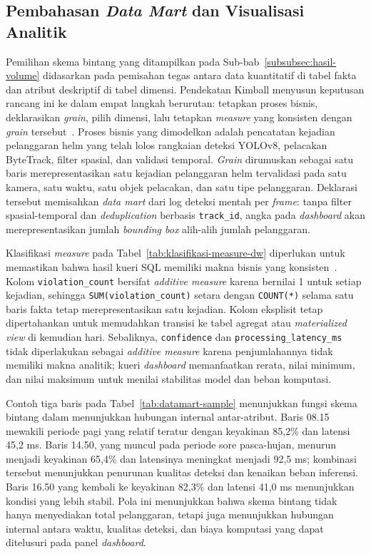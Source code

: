 \subsection{Pembahasan \textit{Data Mart} dan Visualisasi Analitik}
\label{subsec:pembahasan-datamart}

Pemilihan skema bintang yang ditampilkan pada Sub-bab~\ref{subsubsec:hasil-volume} didasarkan pada pemisahan tegas antara data kuantitatif di tabel fakta dan atribut deskriptif di tabel dimensi. Pendekatan Kimball menyusun keputusan rancang ini ke dalam empat langkah berurutan: tetapkan proses bisnis, deklarasikan \textit{grain}, pilih dimensi, lalu tetapkan \textit{measure} yang konsisten dengan \textit{grain} tersebut~\cite{kimball2013dwtoolkit}. Proses bisnis yang dimodelkan adalah pencatatan kejadian pelanggaran helm yang telah lolos rangkaian deteksi YOLOv8, pelacakan ByteTrack, filter spasial, dan validasi temporal. \textit{Grain} dirumuskan sebagai satu baris merepresentasikan satu kejadian pelanggaran helm tervalidasi pada satu kamera, satu waktu, satu objek pelacakan, dan satu tipe pelanggaran. Deklarasi tersebut memisahkan \textit{data mart} dari log deteksi mentah per \textit{frame}: tanpa filter spasial-temporal dan \textit{deduplication} berbasis \texttt{track\_id}, angka pada \textit{dashboard} akan merepresentasikan jumlah \textit{bounding box} alih-alih jumlah pelanggaran.

Klasifikasi \textit{measure} pada Tabel~\ref{tab:klasifikasi-measure-dw} diperlukan untuk memastikan bahwa hasil kueri SQL memiliki makna bisnis yang konsisten~\cite{kimball2013dwtoolkit}. Kolom \texttt{violation\_count} bersifat \textit{additive measure} karena bernilai 1 untuk setiap kejadian, sehingga \texttt{SUM(violation\_count)} setara dengan \texttt{COUNT(*)} selama satu baris fakta tetap merepresentasikan satu kejadian. Kolom eksplisit tetap dipertahankan untuk memudahkan transisi ke tabel agregat atau \textit{materialized view} di kemudian hari. Sebaliknya, \texttt{confidence} dan \texttt{processing\_latency\_ms} tidak diperlakukan sebagai \textit{additive measure} karena penjumlahannya tidak memiliki makna analitik; kueri \textit{dashboard} memanfaatkan rerata, nilai minimum, dan nilai maksimum untuk menilai stabilitas model dan beban komputasi.

Contoh tiga baris pada Tabel~\ref{tab:datamart-sample} menunjukkan fungsi skema bintang dalam menunjukkan hubungan internal antar-atribut. Baris 08.15 mewakili periode pagi yang relatif teratur dengan keyakinan 85,2\% dan latensi 45,2 ms. Baris 14.50, yang muncul pada periode sore pasca-hujan, menurun menjadi keyakinan 65,4\% dan latensinya meningkat menjadi 92,5 ms; kombinasi tersebut menunjukkan penurunan kualitas deteksi dan kenaikan beban inferensi. Baris 16.50 yang kembali ke keyakinan 82,3\% dan latensi 41,0 ms menunjukkan kondisi yang lebih stabil. Pola ini menunjukkan bahwa skema bintang tidak hanya menyediakan total pelanggaran, tetapi juga menunjukkan hubungan internal antara waktu, kualitas deteksi, dan biaya komputasi yang dapat ditelusuri pada panel \textit{dashboard}.

